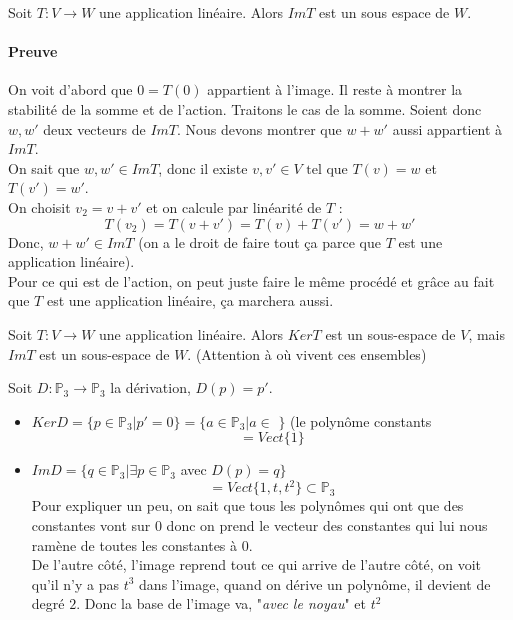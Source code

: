 \begin{theoreme}
    Soit $T : V \to W$ une application linéaire. Alors $Im T$ est un sous espace de $W$.
\end{theoreme}
\paragraph{Preuve}
On voit d'abord que $0 = T(0)$ appartient à l'image. Il reste à montrer la stabilité de la somme et de l'action. Traitons le cas de la somme. Soient donc $w, w'$ deux vecteurs de $Im T$. Nous devons montrer que $w + w'$ aussi appartient à $Im T$.
\\
On sait que $w, w' \in ImT$, donc il existe $v, v' \in V \text{ tel que } T(v) = w $ et $T(v') = w'$.\\
On choisit $v_2 = v + v'$ et on calcule par linéarité de $T$ : \[T(v_2) = T(v + v') = T(v) + T(v') = w + w'\]
Donc, $w + w' \in Im T$  (on a le droit de faire tout ça parce que $T$ est une application linéaire).
\\
Pour ce qui est de l'action, on peut juste faire le même procédé et grâce au fait que $T$ est une application linéaire, ça marchera aussi.


\begin{framedremark}
    Soit $T : V \to W$ une application linéaire. Alors $Ker T$ est un sous-espace de $V$, mais $Im T$ est un sous-espace de $W$. (Attention à où vivent ces ensembles)
\end{framedremark}

\begin{exemple}
    Soit $D : \mathbb{P}_3 \to \mathbb{P}_3$ la dérivation, $D(p) = p'$.
    \begin{itemize}
        \item $Ker D = \{p \in \mathbb{P}_3 | p' = 0\} = \{a \in \mathbb{P}_3 | a \in $ \R $\}$ (le polynôme constants \[= Vect\{1\}\]

        \item $Im D = \{q \in \mathbb{P}_3 | \exists p \in \mathbb{P}_3$ avec $D(p)  = q\}$
\[= Vect\{1, t, t^2\} \subset \mathbb{P}_3\]
Pour expliquer un peu, on sait que tous les polynômes qui ont que des constantes vont sur $0$ donc on prend le vecteur des constantes qui lui nous ramène de toutes les constantes à $0$.\\
De l'autre côté, l'image reprend tout ce qui arrive de l'autre côté, on voit qu'il n'y a pas $t^3$ dans l'image, quand on dérive un polynôme, il devient de degré $2$. Donc la base de l'image va, "\textit{avec le noyau}" et $t^2$

    \end{itemize}
\end{exemple}

